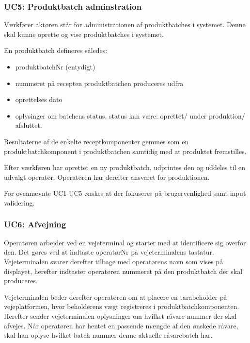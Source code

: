 \documentclass[a4paper]{article}
\begin{document}

\subsubsection{UC5: Produktbatch adminstration} %

Værkfører aktøren står for administrationen af produktbatches i systemet. Denne skal kunne oprette og vise produktbatches i systemet.

En produktbatch defineres således:

\begin{itemize}
  \item produktbatchNr (entydigt)
  \item nummeret på recepten produktbatchen produceres udfra
  \item oprettelses dato
  \item oplysinger om batchens status, status kan være: oprettet/ under produktion/ afsluttet.
\end{itemize}

Resultaterne af de enkelte receptkomponenter gemmes som en produktbatchkomponent i produktbatchen samtidig med at produktet fremstilles.

Efter værkføren har oprettet en ny produktbatch, udprintes den og uddeles til en udvalgt operatør. Operatøren har derefter ansvaret for produktionen. 

For ovennævnte UC1-UC5 ønskes at der fokuseres på brugervenlighed samt input validering.


\subsubsection{UC6: Afvejning} %

Operatøren arbejder ved en vejeterminal og starter med at identificere sig overfor den. Det gøres ved at indtaste operatørNr på vejeterminalens tastatur. Vejeterminalen svarer derefter tilbage med operatørens navn som vises på displayet, herefter indtaster operatøren nummeret på den produktbatch der skal produceres.

Vejeterminalen beder derefter operatøren om at placere en tarabeholder på vejeplatformen, hvor beholderens vægt registreres i produktbatchkomponenten. Herefter sender vejeterminalen oplysninger om hvilket råvare nummer der skal afvejes. Når operatøren har hentet en passende mængde af den ønskede råvare, skal han oplyse hvilket batch nummer denne aktuelle råvarebatch har.
\end{document}
